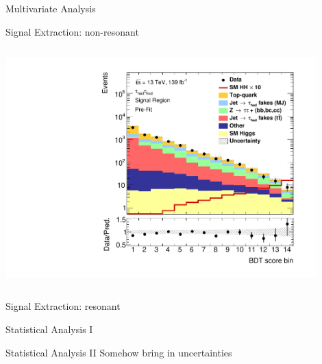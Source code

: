 \documentclass[11pt, xcolor={dvipsnames}, aspectratio=169]{beamer}
\begin{document}

\begin{frame}{Multivariate Analysis}
\end{frame}


\begin{frame}{Signal Extraction: non-resonant}
  \begin{columns}

    \centering
    \includegraphics[width=0.9\textwidth]{mva/prefit/Region_BMin0_incJet1_distSMBDT_J2_Y2015_DLLOS_T2_SpcTauHH_L0_Prefitlog}
  \end{columns}
\end{frame}


\begin{frame}{Signal Extraction: resonant}
\end{frame}


\begin{frame}{Statistical Analysis I}
\end{frame}


\begin{frame}{Statistical Analysis II}
  Somehow bring in uncertainties
\end{frame}
\end{document}
